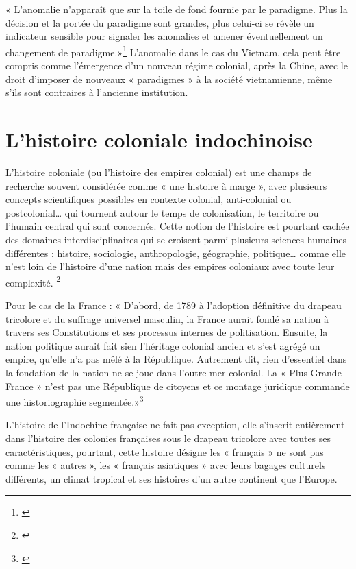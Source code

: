 « L'anomalie n'apparaît que sur la toile de fond fournie par le paradigme. Plus la décision et la portée du paradigme sont grandes, plus celui-ci se révèle un indicateur sensible pour signaler les anomalies et amener éventuellement un changement de paradigme.»\footnote{\cite{klun}}
L'anomalie dans le cas du Vietnam, cela peut être compris comme l'émergence d'un nouveau régime colonial, après la Chine, avec le droit d'imposer de nouveaux « paradigmes » à la société vietnamienne, même s'ils sont contraires à l'ancienne institution.


\section{L'histoire coloniale indochinoise}
L’histoire coloniale (ou l’histoire des empires colonial) est une champs de recherche souvent considérée comme « une histoire à marge », avec plusieurs concepts scientifiques possibles en contexte colonial, anti-colonial ou postcolonial… qui tournent autour le temps de colonisation, le territoire ou l’humain central qui sont concernés. Cette notion de l’histoire est pourtant cachée des domaines interdisciplinaires qui se croisent parmi plusieurs sciences humaines différentes : histoire, sociologie, anthropologie, géographie, politique… comme elle n’est loin de l’histoire d’une nation mais des empires coloniaux avec toute leur complexité. \footnote{\cites{Dulucq2003UneHE}}

Pour le cas de la France : 
« D’abord, de 1789 à l’adoption définitive du drapeau tricolore et du suffrage universel masculin, la France aurait fondé sa nation à travers ses Constitutions et ses processus internes de politisation.
Ensuite, la nation politique aurait fait sien l’héritage colonial ancien et s’est agrégé un empire, qu’elle n’a pas mêlé à la République. Autrement dit, rien d’essentiel dans la fondation de la nation ne se joue dans l’outre-mer colonial. La « Plus Grande France » n’est pas une République de citoyens et ce montage juridique commande une historiographie segmentée.»\footnote{\cites{Annales06}}

L’histoire de l’Indochine française ne fait pas exception, elle s’inscrit entièrement dans l’histoire des colonies françaises sous le drapeau tricolore avec toutes ses caractéristiques, pourtant, cette histoire désigne les « français » ne sont pas comme les « autres », les « français asiatiques » avec leurs bagages culturels différents, un climat tropical et ses histoires d’un autre continent que l’Europe.

